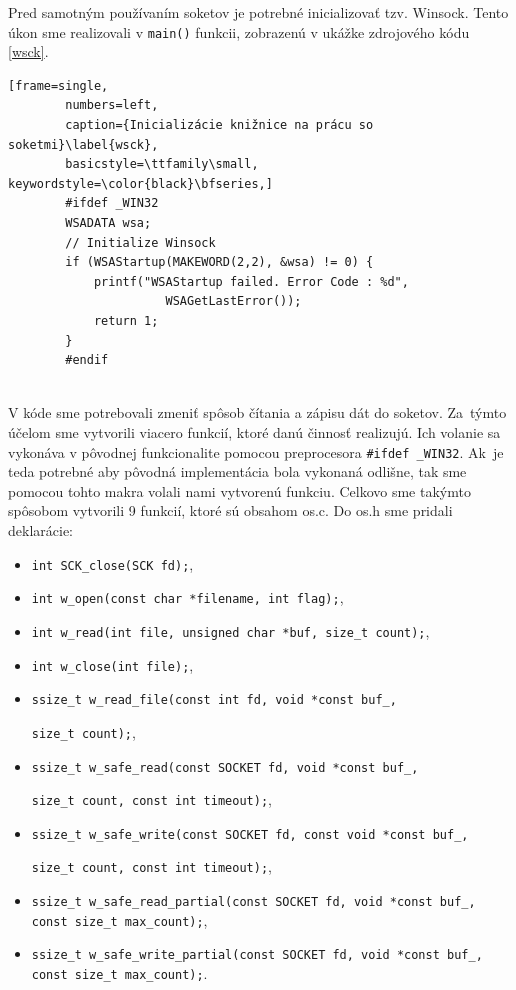 Pred samotným používaním soketov je potrebné inicializovať tzv. Winsock. Tento úkon sme realizovali v \lstinline|main()| funkcii, zobrazenú v ukážke zdrojového kódu \ref{wsck}.

\begin{minipage}{\linewidth} 	
	\begin{lstlisting}[frame=single,
		numbers=left,
		caption={Inicializácie knižnice na prácu so soketmi}\label{wsck},
		basicstyle=\ttfamily\small, keywordstyle=\color{black}\bfseries,]
		#ifdef _WIN32
		WSADATA wsa;
		// Initialize Winsock
		if (WSAStartup(MAKEWORD(2,2), &wsa) != 0) {
			printf("WSAStartup failed. Error Code : %d",
				      WSAGetLastError());
			return 1;
		}
		#endif
	\end{lstlisting}
\end{minipage}\\

V kóde sme potrebovali zmeniť spôsob čítania a zápisu dát do soketov. Za~týmto účelom sme vytvorili viacero funkcií, ktoré danú činnosť realizujú. Ich volanie sa vykonáva v pôvodnej funkcionalite pomocou preprocesora \lstinline|#ifdef _WIN32|. Ak~je teda potrebné aby pôvodná implementácia bola vykonaná odlišne, tak sme pomocou tohto makra volali nami vytvorenú funkciu. Celkovo sme takýmto spôsobom vytvorili 9 funkcií, ktoré sú obsahom os.c. Do os.h sme pridali deklarácie:
\begin{itemize}
	\item\lstinline|int SCK_close(SCK fd);|,
	\item\lstinline|int w_open(const char *filename, int flag);|,
	\item\lstinline|int w_read(int file, unsigned char *buf, size_t count);|,
	\item\lstinline|int w_close(int file);|,
	\item\lstinline|ssize_t w_read_file(const int fd, void *const buf_,|
	 
					\lstinline|size_t count);|,
	\item\lstinline|ssize_t w_safe_read(const SOCKET fd, void *const buf_, | 
	
					\lstinline|size_t count, const int timeout);|,
	\item\lstinline|ssize_t w_safe_write(const SOCKET fd, const void *const buf_, |
	
					\lstinline|size_t count, const int timeout);|,
	\item\lstinline|ssize_t w_safe_read_partial(const SOCKET fd, void *const buf_, |
					\lstinline|const size_t max_count);|,
	\item\lstinline|ssize_t w_safe_write_partial(const SOCKET fd, void *const buf_,| 
					\lstinline|const size_t max_count);|.
\end{itemize}  

